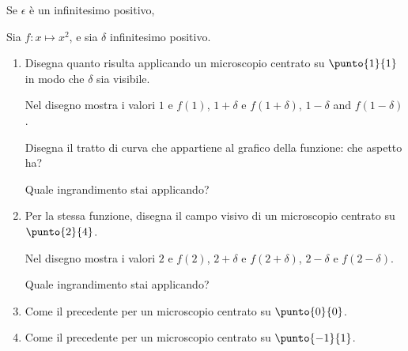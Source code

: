 \begin{esercizio}
 Se $\epsilon$ è un infinitesimo positivo, 
\end{esercizio}

\begin{esercizio}
Sia $f:x\mapsto x^2$,  e sia $\delta$ infinitesimo positivo.

\begin{enumerate} [noitemsep]
\item Disegna quanto risulta applicando un microscopio centrato su $\punto{1}{1}$
in modo che $\delta$ sia visibile.

Nel disegno mostra i valori $1$ e $f(1)$,  $1+\delta$ e 
$f(1+\delta)$,  $1-\delta$ and $f(1-\delta)$.

Disegna il tratto di curva che appartiene al grafico della funzione: che 
aspetto ha?

Quale ingrandimento stai applicando?

\item Per la stessa funzione, disegna il campo visivo di un microscopio
centrato su $\punto{2}{4}$.

Nel disegno mostra i valori $2$ e $f(2)$, $2+\delta$ e $f(2+\delta)$, 
$2-\delta$ e $f(2-\delta)$.

Quale ingrandimento stai applicando?

\item Come il precedente per un microscopio centrato su $\punto {0}{0}$.
\item Come il precedente per un microscopio centrato su $\punto {-1}{1}$.
\end{enumerate}
\end{esercizio}



